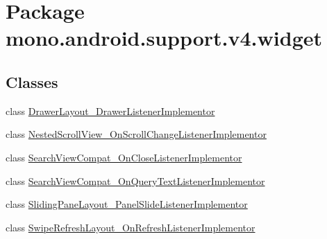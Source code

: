 \hypertarget{namespacemono_1_1android_1_1support_1_1v4_1_1widget}{
\section{Package mono.android.support.v4.widget}
\label{namespacemono_1_1android_1_1support_1_1v4_1_1widget}
}
\subsection*{Classes}
\begin{CompactItemize}
\item 
class \hyperlink{classmono_1_1android_1_1support_1_1v4_1_1widget_1_1_drawer_layout___drawer_listener_implementor}{DrawerLayout\_\-DrawerListenerImplementor}
\item 
class \hyperlink{classmono_1_1android_1_1support_1_1v4_1_1widget_1_1_nested_scroll_view___on_scroll_change_listener_implementor}{NestedScrollView\_\-OnScrollChangeListenerImplementor}
\item 
class \hyperlink{classmono_1_1android_1_1support_1_1v4_1_1widget_1_1_search_view_compat___on_close_listener_implementor}{SearchViewCompat\_\-OnCloseListenerImplementor}
\item 
class \hyperlink{classmono_1_1android_1_1support_1_1v4_1_1widget_1_1_search_view_compat___on_query_text_listener_implementor}{SearchViewCompat\_\-OnQueryTextListenerImplementor}
\item 
class \hyperlink{classmono_1_1android_1_1support_1_1v4_1_1widget_1_1_sliding_pane_layout___panel_slide_listener_implementor}{SlidingPaneLayout\_\-PanelSlideListenerImplementor}
\item 
class \hyperlink{classmono_1_1android_1_1support_1_1v4_1_1widget_1_1_swipe_refresh_layout___on_refresh_listener_implementor}{SwipeRefreshLayout\_\-OnRefreshListenerImplementor}
\end{CompactItemize}
